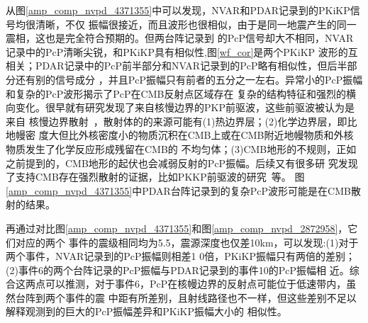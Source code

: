 从图\ref{amp_comp_nvpd_4371355}中可以发现，NVAR和PDAR记录到的PKiKP信号均很清晰，不仅
振幅很接近，而且波形也很相似，由于是同一地震产生的同一震相，这也是完全符合预期的。但两台阵记录到
的PcP信号却大不相同，NVAR记录中的PcP清晰尖锐，和PKiKP具有相似性,图\ref{wf_cor}是两个PKiKP
波形的互相关；PDAR记录中的PcP前半部分和NVAR记录到的PcP略有相似性，但后半部分还有别的信号成分
，并且PcP振幅只有前者的五分之一左右。异常小的PcP振幅和复杂的PcP波形揭示了PcP在CMB反射点区域存在
复杂的结构特征和强烈的横向变化。很早就有研究发现了来自核慢边界的PKP前驱波，这些前驱波被认为是来自
核慢边界散射~\citep{Bataille1988}，散射体的的来源可能有(1)热边界层；(2)化学边界层，即比地幔密
度大但比外核密度小的物质沉积在CMB上或在CMB附近地幔物质和外核物质发生了化学反应形成残留在CMB的
不均匀体；(3)CMB地形的不规则，正如之前提到的，CMB地形的起伏也会减弱反射的PcP振幅。后续又有很多研
究发现了支持CMB存在强烈散射的证据，比如PKKP前驱波的研究~\citep{Rost2010616}等。
图\ref{amp_comp_nvpd_4371355}中PDAR台阵记录到的复杂PcP波形可能是在CMB散射的结果。

再通过对比图\ref{amp_comp_nvpd_4371355}和图\ref{amp_comp_nvpd_2872958}，它们对应的两个
事件的震级相同均为5.5，震源深度也仅差10km，可以发现:(1)对于两个事件，NVAR记录到的PcP振幅则相差1
0倍，PKiKP振幅只有两倍的差别；(2)事件6的两个台阵记录的PcP振幅与PDAR记录到的事件10的PcP振幅相
近。综合这两点可以推测，对于事件6，PcP在核幔边界的反射点可能位于低速带内，虽然台阵到两个事件的震
中距有所差别，且射线路径也不一样，但这些差别不足以解释观测到的巨大的PcP振幅差异和PKiKP振幅大小的
相似性。